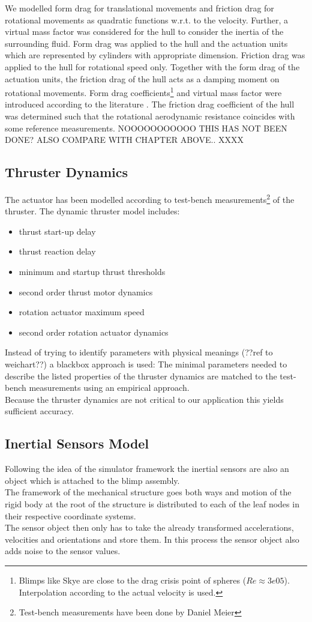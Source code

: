 We modelled form drag for translational movements and friction drag for rotational movements as quadratic functions w.r.t. to the velocity.
Further, a virtual mass factor was considered for the hull to consider the inertia of the surrounding fluid.
Form drag was applied to the hull and the actuation units which are represented by cylinders with appropriate dimension.
Friction drag was applied to the hull for rotational speed only.
Together with the form drag of the actuation units, the friction drag of the hull acts as a damping moment on rotational movements.
Form drag coefficients\footnote{
Blimps like Skye are close to the drag crisis point of spheres ($Re\approx3e05$). Interpolation according to the actual velocity is used.} and virtual mass factor were introduced according to the literature \citep{Kundu2012}.
The friction drag coefficient of the hull was determined such that the rotational aerodynamic resistance coincides with some reference measurements.
NOOOOOOOOOOO THIS HAS NOT BEEN DONE?
ALSO COMPARE WITH CHAPTER ABOVE.. XXXX

\subsection{Thruster Dynamics}
\label{sub:thrust_dynamics}
The actuator has been modelled according to test-bench measurements\footnote{Test-bench measurements have been done by Daniel Meier} of the thruster.
The dynamic thruster model includes:
\begin{itemize}
\item thrust start-up delay
\item thrust reaction delay
\item minimum and startup thrust thresholds
\item second order thrust motor dynamics
\item rotation actuator maximum speed
\item second order rotation actuator dynamics
\end{itemize}
Instead of trying to identify parameters with physical meanings (??ref to weichart??) a blackbox approach is used:
The minimal parameters needed to describe the listed properties of the thruster dynamics are matched to the test-bench measurements using an empirical approach.  \\
Because the thruster dynamics are not critical to our application this yields sufficient accuracy.

\subsection{Inertial Sensors Model}
\label{sub:imu_model}
Following the idea of the simulator framework the inertial sensors are also an object which is attached to the blimp assembly. \\
The framework of the mechanical structure goes both ways and motion of the rigid body at the root of the structure is distributed to each of the leaf nodes in their respective coordinate systems. \\
The sensor object then only has to take the already transformed accelerations, velocities and orientations and store them.
In this process the sensor object also adds noise to the sensor values.

